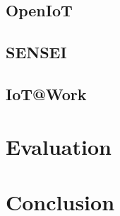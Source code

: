 \documentclass[journal]{IEEEtran}
\begin{document}
\blindtext

  \subsection{OpenIoT}
  \Blindtext

  \subsection{SENSEI}
  \Blindtext

  \subsection{IoT@Work}
  \Blindtext

\section{Evaluation}
\Blindtext

\section{Conclusion}
\Blindtext



\end{document}
